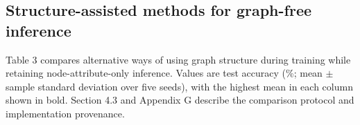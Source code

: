 \documentclass[preprint,12pt]{elsarticle}
\newlength{\TableWidth}
\begin{document}
\Needspace{344pt}

\subsection{Structure-assisted methods for graph-free inference}\label{sec:5.2}

Table 3 compares alternative ways of using graph structure during training while retaining node-attribute-only inference. Values are test accuracy (\%; mean \ensuremath{\pm} sample standard deviation over five seeds), with the highest mean in each column shown in bold. Section 4.3 and Appendix G describe the comparison protocol and implementation provenance.

\Needspace{269pt}
\begingroup
\fontsize{9}{11}\selectfont
\setlength{\tabcolsep}{3pt}
\renewcommand{\arraystretch}{1.18}
\setlength{\TableWidth}{\dimexpr\linewidth-12\tabcolsep\relax}
\end{document}
